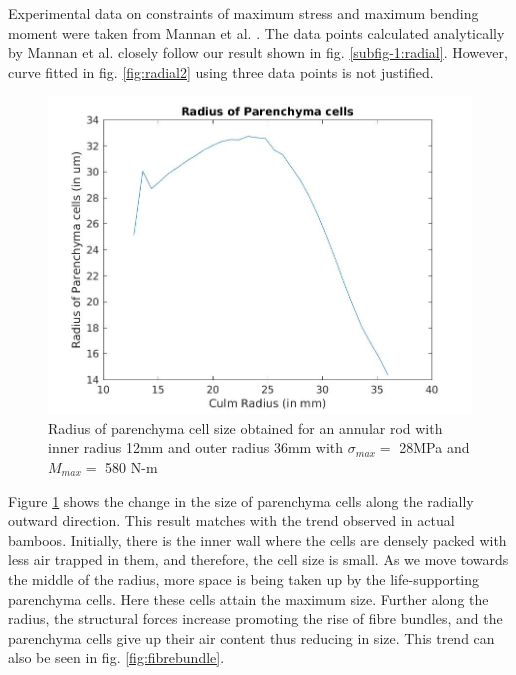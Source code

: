 \documentclass[openright,twoside]{iitkthesis}
\begin{document}
Experimental data on constraints of maximum stress and maximum bending moment were taken from Mannan et al. \cite{mannan2017correlations}. The data points calculated analytically by Mannan et al. \cite{mannan2017correlations} closely follow our result shown in fig. \ref{subfig-1:radial}. However, curve fitted in fig. \ref{fig:radial2} using three data points is not justified.\\
\begin{figure}[H]
\begin{center}
    \includegraphics[scale=0.3]{./Plots/normal/b77.jpg}
    \caption{Radius of parenchyma cell size obtained for an annular rod with inner radius 12mm and outer radius 36mm with $\sigma_{max} = $ 28MPa and $M_{max} = $ 580 N-m}
\label{fig:cellsize}
\end{center}
\end{figure}
Figure \ref{fig:cellsize} shows the change in the size of parenchyma cells along the radially outward direction. This result matches with the trend observed in actual bamboos. Initially, there is the inner wall where the cells are densely packed with less air trapped in them, and therefore, the cell size is small. As we move towards the middle of the radius, more space is being taken up by the life-supporting parenchyma cells. Here these cells attain the maximum size. Further along the radius, the structural forces increase promoting the rise of fibre bundles, and the parenchyma cells give up their air content thus reducing in size. This trend can also be seen in fig. \ref{fig:fibrebundle}.
\end{document}

